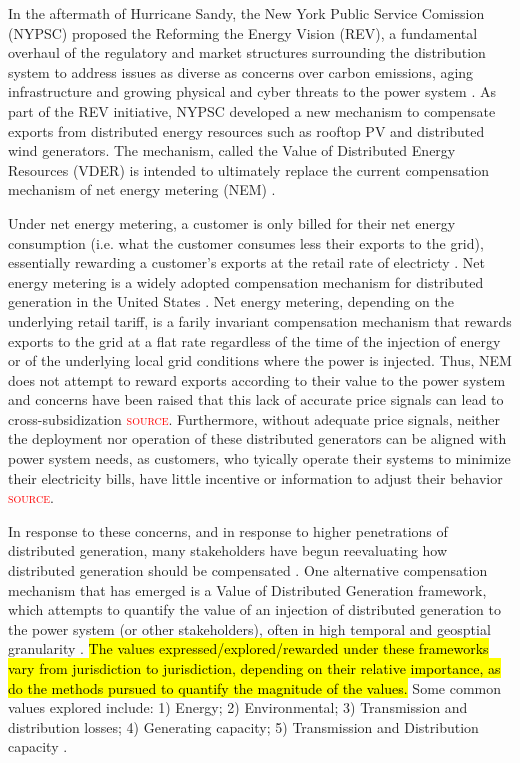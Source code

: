 In the aftermath of Hurricane Sandy, the New York Public Service Comission (NYPSC) proposed the Reforming the Energy Vision (REV), a fundamental overhaul of the regulatory and market structures surrounding the distribution system to address issues as diverse as concerns over carbon emissions, aging infrastructure and growing physical and cyber threats to the power system \cite{nypsc_reforming_2014}. As part of the REV initiative, NYPSC developed a new mechanism to compensate exports from distributed energy resources such as rooftop PV and distributed wind generators. The mechanism, called the Value of Distributed Energy Resources (VDER) is intended to ultimately replace the current compensation mechanism of net energy metering (NEM) \cite{nypsc_order_2017}. 

Under net energy metering, a customer is only billed for their net energy consumption (i.e. what the customer consumes less their exports to the grid), essentially rewarding a customer's exports at the retail rate of electricty \cite{zinaman_grid-connected_2017}. Net energy metering is a widely adopted compensation mechanism for distributed generation in the United States \cite{proudlove_50_2020}. Net energy metering, depending on the underlying retail tariff, is a farily invariant compensation mechanism that rewards exports to the grid at a flat rate regardless of the time of the injection of energy or of the underlying local grid conditions where the power is injected. Thus, NEM does not attempt to reward exports according to their value to the power system and concerns have been raised that this lack of accurate price signals can lead to cross-subsidization \textcolor{red}{\textsc{source}}. Furthermore, without adequate price signals, neither the deployment nor operation of these distributed generators can be aligned with power system needs, as customers, who tyically operate their systems to minimize their electricity bills, have little incentive or information to adjust their behavior \textcolor{red}{\textsc{source}}.

In response to these concerns, and in response to higher penetrations of distributed generation, many stakeholders have begun reevaluating how distributed generation should be compensated \cite{proudlove_50_2020}. One alternative compensation mechanism that has emerged is a Value of Distributed Generation framework, which attempts to quantify the value of an injection of distributed generation to the power system (or other stakeholders), often in high temporal and geosptial granularity \cite{denholm_methods_2014}. \hl{The values expressed/explored/rewarded under these frameworks vary from jurisdiction to jurisdiction, depending on their relative importance, as do the methods pursued to quantify the magnitude of the values.} Some common values explored include: 1) Energy; 2) Environmental; 3) Transmission and distribution losses; 4) Generating capacity; 5) Transmission and Distribution capacity \cite{proudlove_50_2020}.


